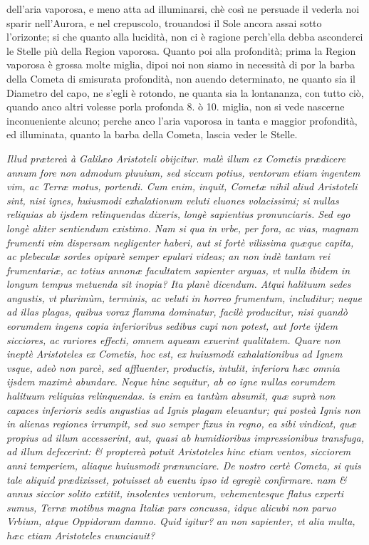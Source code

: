 \documentclass[11pt,twoside,openany]{book}
\begin{document}
dell'aria vaporosa, e meno atta ad illuminarsi, chè così ne persuade il vederla noi sparir nell'Aurora, e nel crepuscolo, trouandosi il Sole ancora assai sotto l'orizonte; si che quanto alla lucidità, non ci è ragione perch'ella debba asconderci le Stelle più della Region vaporosa. Quanto poi alla profondità; prima la Region vaporosa è grossa molte miglia, dipoi noi non siamo in necessità di por la barba della Cometa di smisurata profondità, non auendo determinato, ne quanto sia il Diametro del capo, ne s'egli è rotondo, ne quanta sia la lontananza, con tutto ciò, quando anco altri volesse porla profonda 8. ò 10. miglia, non si vede nascerne inconueniente alcuno; perche anco l'aria vaporosa in tanta e maggior profondità, ed illuminata, quanto la barba della Cometa, lascia veder le Stelle.



\par\bigskip\noindent{}\enspace \textit{Illud prætereà à Galilæo Aristoteli obijcitur. malè illum ex Cometis prædicere annum fore non admodum pluuium, sed siccum potius, ventorum etiam ingentem vim, ac Terræ motus, portendi. Cum enim, inquit, Cometæ nihil aliud Aristoteli sint, nisi ignes, huiusmodi exhalationum veluti eluones volacissimi; si nullas reliquias ab ijsdem relinquendas dixeris, longè sapientius pronunciaris. Sed ego longè aliter sentiendum existimo. Nam si qua in vrbe, per fora, ac vias, magnam frumenti vim dispersam negligenter haberi, aut si fortè vilissima quæque capita, ac plebeculæ sordes opiparè semper epulari videas; an non indè tantam rei frumentariæ, ac totius annonæ facultatem sapienter arguas, vt nulla ibidem in longum tempus metuenda sit inopia? Ita planè dicendum. Atqui halituum sedes angustis, vt plurimùm, terminis, ac veluti in horreo frumentum, includitur; neque ad illas plagas, quibus vorax flamma dominatur, facilè producitur, nisi quandò eorumdem ingens copia inferioribus sedibus cupi non potest, aut forte ijdem sicciores, ac rariores effecti, omnem aqueam exuerint qualitatem. Quare non ineptè Aristoteles ex Cometis, hoc }\textit{est, ex huiusmodi exhalationibus ad Ignem vsque, adeò non parcè, sed affluenter, productis, intulit, inferiora hæc omnia ijsdem maximè abundare. Neque hinc sequitur, ab eo igne nullas eorumdem halituum reliquias relinquendas. is enim ea tantùm absumit, quæ suprà non capaces inferioris sedis angustias ad Ignis plagam eleuantur; qui posteà Ignis non in alienas regiones irrumpit, sed suo semper fixus in regno, ea sibi vindicat, quæ propius ad illum accesserint, aut, quasi ab humidioribus impressionibus transfuga, ad illum defecerint: \& proptereà potuit Aristoteles hinc etiam ventos, sicciorem anni temperiem, aliaque huiusmodi prænunciare. De nostro certè Cometa, si quis tale aliquid prædixisset, potuisset ab euentu ipso id egregiè confirmare. nam \& annus siccior solito extitit, insolentes ventorum, vehementesque flatus experti sumus, Terræ motibus magna Italiæ pars concussa, idque alicubi non paruo Vrbium, atque Oppidorum damno. Quid igitur?}\textit{ }\textit{an non sapienter, vt alia multa, hæc etiam Aristoteles enunciauit?}
\end{document}
